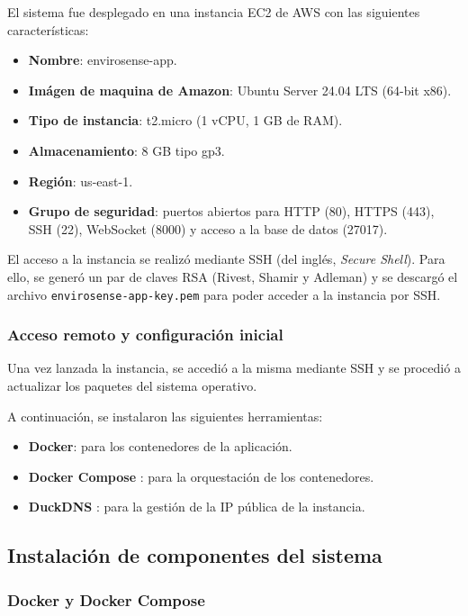 El sistema fue desplegado en una instancia EC2 de AWS con las siguientes
características:

\begin{itemize}
    \item \textbf{Nombre}: envirosense-app.
    \item \textbf{Imágen de maquina de Amazon}: Ubuntu Server 24.04 LTS (64-bit x86).
    \item \textbf{Tipo de instancia}: t2.micro (1 vCPU, 1 GB de RAM).
    \item \textbf{Almacenamiento}: 8 GB tipo gp3.
    \item \textbf{Región}: us-east-1.
    \item \textbf{Grupo de seguridad}: puertos abiertos para HTTP (80), HTTPS (443),
          SSH (22), WebSocket (8000) y acceso a la base de datos (27017).
\end{itemize}

El acceso a la instancia se realizó mediante SSH (del inglés, \textit{Secure
    Shell}). Para ello, se generó un par de claves RSA (Rivest, Shamir y Adleman) y
se descargó el archivo \texttt{envirosense-app-key.pem} para poder acceder a la
instancia por SSH.

\subsubsection{Acceso remoto y configuración inicial}

Una vez lanzada la instancia, se accedió a la misma mediante SSH y se procedió
a actualizar los paquetes del sistema operativo.

A continuación, se instalaron las siguientes herramientas:
\begin{itemize}
    \item \textbf{Docker}: para los contenedores de la aplicación.
    \item \textbf{Docker Compose} \cite{DockerCompose}: para la orquestación de los
          contenedores.
    \item \textbf{DuckDNS} \cite{DuckDNS}: para la gestión de la IP pública de la
          instancia.
\end{itemize}

\subsection{Instalación de componentes del sistema}

\subsubsection{Docker y Docker Compose}

